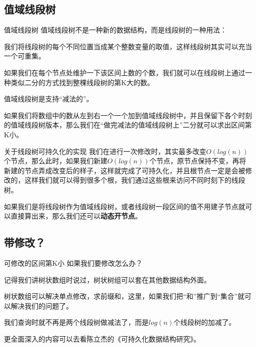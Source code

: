 \documentclass{beamer}
\begin{document}
		\subsection{值域线段树}
		\begin{frame}{值域线段树}
			值域线段树不是一种新的数据结构，而是线段树的一种用法：
			
			我们将线段树的每个不同位置当成某个整数变量的取值，这样线段树其实可以充当一个可重集。
			
			如果我们在每个节点处维护一下该区间上数的个数，我们就可以在线段树上通过一种类似二分的方式找到整棵线段树的第K大的数。
			
			值域线段树是支持“减法的”。
			
			如果我们将数组中的数从左到右一个一个加到值域线段树中，并且保留下各个时刻的值域线段树版本，那么我们在“做完减法的值域线段树上”二分就可以求出区间第K小。
		\end{frame} 
		\begin{frame}{关于线段树可持久化的实现}
			我们在进行一次修改时，其实最多改变$O(log(n))$个节点，那么此时，如果我们新建$O(log(n))$个节点，原节点保持不变，再将新建的节点弄成改变后的样子，这样就完成了可持久化，并且根节点一定是会被修改的，这样我们就可以得到很多个根，我们通过这些根来访问不同时刻下的线段树。
			
			如果我们是将线段树作为值域线段树，或者线段树一段区间的值不用建子节点就可以直接算出来，那么我们还可以\textbf{动态开节点}。
		\end{frame} 
		\subsection{带修改？}
		\begin{frame}{可修改的区间第K小}
			如果我们要修改怎么办？
			
			记得我们讲树状数组时说过，树状树组可以套在其他数据结构外面。
			
			树状数组可以解决单点修改，求前缀和，这里，如果我们把“和”推广到“集合”就可以解决我们的问题了。
			
			我们查询时就不再是两个线段树做减法了，而是$log(n)$个线段树的加减了。
			
			更全面深入的内容可以去看陈立杰的《可持久化数据结构研究》。
		\end{frame} 
	
\end{document}
